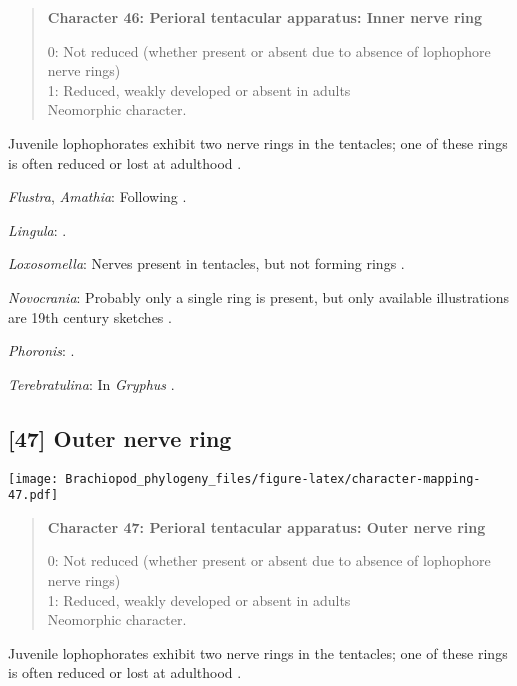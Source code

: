 \documentclass[openany]{book}
\theoremstyle{definition}
\theoremstyle{definition}
\theoremstyle{definition}
\theoremstyle{remark}
\begin{document}
\begin{quote}
\textbf{Character 46: Perioral tentacular apparatus: Inner nerve ring}

0: Not reduced (whether present or absent due to absence of lophophore
nerve rings)\\
1: Reduced, weakly developed or absent in adults\\
Neomorphic character.
\end{quote}

Juvenile lophophorates exhibit two nerve rings in the tentacles; one of
these rings is often reduced or lost at adulthood
\citep{Temereva2017Innervationof}.

\hypertarget{Amathia-coding-46}{}
\emph{Flustra}, \emph{Amathia}: Following
\citet{Temereva2017Innervationof}.

\hypertarget{Lingula-coding-46}{}
\emph{Lingula}: \citet{Temereva2017Thefirst}.

\hypertarget{Loxosomella-coding-46}{}
\emph{Loxosomella}: Nerves present in tentacles, but not forming rings
\citep{Fuchs2006}.

\hypertarget{Novocrania-coding-46}{}
\emph{Novocrania}: Probably only a single ring is present, but only
available illustrations are 19th century sketches \citep{Luter2016}.

\hypertarget{Phoronis-coding-46}{}
\emph{Phoronis}: \citep{Temereva2017Innervationof}.

\hypertarget{Terebratulina-coding-46}{}
\emph{Terebratulina}: In \emph{Gryphus} \citep{Temereva2017Thefirst}.

\subsection*{{[}47{]} Outer nerve ring}\label{outer-nerve-ring}

\texttt{[image: Brachiopod\_phylogeny\_files/figure-latex/character-mapping-47.pdf]}

\begin{quote}
\textbf{Character 47: Perioral tentacular apparatus: Outer nerve ring}

0: Not reduced (whether present or absent due to absence of lophophore
nerve rings)\\
1: Reduced, weakly developed or absent in adults\\
Neomorphic character.
\end{quote}

Juvenile lophophorates exhibit two nerve rings in the tentacles; one of
these rings is often reduced or lost at adulthood
\citep{Temereva2017Innervationof}.
\end{document}
